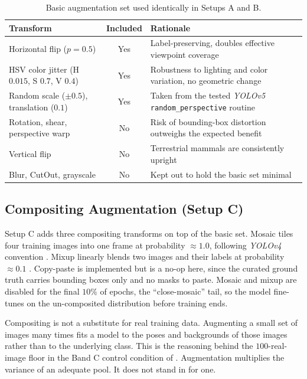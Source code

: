 \begin{table}[htbp]
\centering
\caption{Basic augmentation set used identically in Setups A and B.}
\label{tab:basic-augmentation}
\begin{tabularx}{\textwidth}{@{}lcX@{}}
\toprule
Transform & Included & Rationale \\
\midrule
Horizontal flip ($p=0.5$) & Yes & Label-preserving, doubles effective viewpoint coverage \\
HSV color jitter (H $0.015$, S $0.7$, V $0.4$) & Yes & Robustness to lighting and color variation, no geometric change \\
Random scale ($\pm 0.5$), translation ($0.1$) & Yes & Taken from the tested \textit{YOLOv5} \cite{ultralyticsComprehensiveGuideUltralytics} \texttt{random\_perspective} routine \\
Rotation, shear, perspective warp & No & Risk of bounding-box distortion outweighs the expected benefit \\
Vertical flip & No & Terrestrial mammals are consistently upright \\
Blur, CutOut, grayscale & No & Kept out to hold the basic set minimal \\
\bottomrule
\end{tabularx}
\end{table}

\subsection{Compositing Augmentation (Setup C)}\label{sec:compositing_augmentation}

Setup C adds three compositing transforms on top of the basic set. Mosaic tiles four training images into one frame at probability $\approx 1.0$, following \textit{YOLOv4} convention \cite{bochkovskiyYOLOv4OptimalSpeed2020}. Mixup linearly blends two images and their labels at probability $\approx 0.1$ \cite{zhangMixupEmpiricalRisk2018}. Copy-paste \cite{ghiasiSimpleCopyPasteStrong2021} is implemented but is a no-op here, since the curated ground truth carries bounding boxes only and no masks to paste. Mosaic and mixup are disabled for the final $10\%$ of epochs, the \enquote{close-mosaic} tail, so the model fine-tunes on the un-composited distribution before training ends.

Compositing is not a substitute for real training data. Augmenting a small set of images many times fits a model to the poses and backgrounds of those images rather than to the underlying class. This is the reasoning behind the $100$-real-image floor in the Band C control condition of . Augmentation multiplies the variance of an adequate pool. It does not stand in for one.

